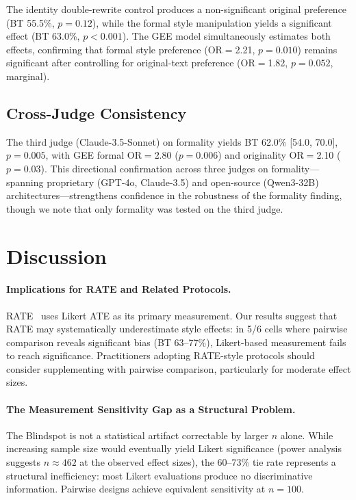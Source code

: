 \documentclass[11pt,a4paper]{article}
\begin{document}
The identity double-rewrite control produces a non-significant original preference (BT 55.5\%, $p=0.12$), while the formal style manipulation yields a significant effect (BT 63.0\%, $p<0.001$). The GEE model simultaneously estimates both effects, confirming that formal style preference (OR$=$2.21, $p=0.010$) remains significant after controlling for original-text preference (OR$=$1.82, $p=0.052$, marginal).

\subsection{Cross-Judge Consistency}

The third judge (Claude-3.5-Sonnet) on formality yields BT 62.0\% [54.0, 70.0], $p=0.005$, with GEE formal OR$=$2.80 ($p=0.006$) and originality OR$=$2.10 ($p=0.03$). This directional confirmation across three judges on formality---spanning proprietary (GPT-4o, Claude-3.5) and open-source (Qwen3-32B) architectures---strengthens confidence in the robustness of the formality finding, though we note that only formality was tested on the third judge.

\section{Discussion}

\paragraph{Implications for RATE and Related Protocols.}
RATE~\cite{chen2025rate} uses Likert ATE as its primary measurement. Our results suggest that RATE may systematically underestimate style effects: in 5/6 cells where pairwise comparison reveals significant bias (BT 63--77\%), Likert-based measurement fails to reach significance. Practitioners adopting RATE-style protocols should consider supplementing with pairwise comparison, particularly for moderate effect sizes.

\paragraph{The Measurement Sensitivity Gap as a Structural Problem.}
The Blindspot is not a statistical artifact correctable by larger $n$ alone. While increasing sample size would eventually yield Likert significance (power analysis suggests $n \approx 462$ at the observed effect sizes), the 60--73\% tie rate represents a structural inefficiency: most Likert evaluations produce no discriminative information. Pairwise designs achieve equivalent sensitivity at $n=100$.
\end{document}
